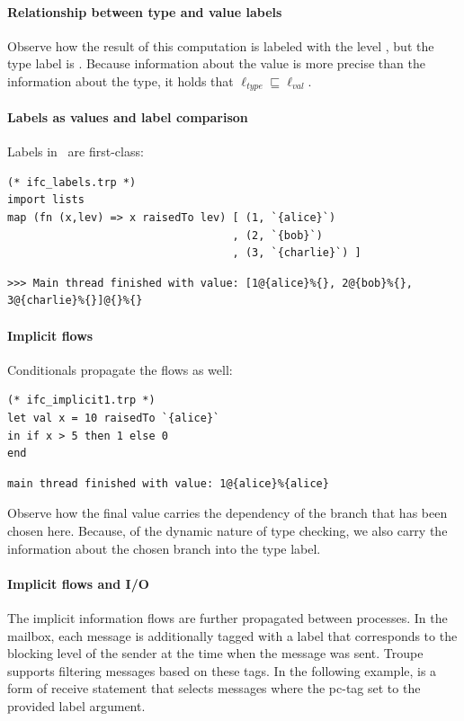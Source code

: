 \paragraph{Relationship between type and value labels}
Observe how the result of this computation is labeled with 
the level , but the type label is \lev{}.
Because information about the value is more precise than the information about the type, it holds that 
$\ell_{\mathit{type}} \sqsubseteq \ell_{\mathit{val}}$. 



\paragraph{Labels as values and label comparison}
Labels in \troupelang\ are first-class:

\begin{lstlisting}
(* ifc_labels.trp *)
import lists
map (fn (x,lev) => x raisedTo lev) [ (1, `{alice}`)
                                   , (2, `{bob}`)
                                   , (3, `{charlie}`) ]
\end{lstlisting}
\begin{lstlisting}
>>> Main thread finished with value: [1@{alice}%{}, 2@{bob}%{}, 
3@{charlie}%{}]@{}%{}    
\end{lstlisting}
\paragraph{Implicit flows}
Conditionals propagate the flows as well:


\begin{lstlisting}
(* ifc_implicit1.trp *)
let val x = 10 raisedTo `{alice}`
in if x > 5 then 1 else 0 
end	
\end{lstlisting}
\begin{verbatim}
main thread finished with value: 1@{alice}%{alice}	
\end{verbatim}
Observe how the final value carries the dependency of the 
branch that has been chosen here. Because, of the dynamic nature of type checking,
we also carry the information about the chosen branch into the type label.




\paragraph{Implicit flows and I/O}
The implicit information flows are further propagated between processes. 
In the mailbox, each message is additionally tagged with a label that 
corresponds to the blocking level of the sender at the time when the message was sent.
Troupe supports filtering messages based on these tags.
In the following example,  is a form of receive statement that selects messages
where the pc-tag set to the provided label argument.

